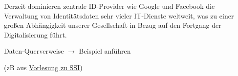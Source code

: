\vspace{0.3cm}


\begin{Problem}

Derzeit dominieren zentrale ID-Provider wie Google und Facebook die Verwaltung von Identitätsdaten sehr vieler IT-Dienste weltweit, was zu einer großen Abhängigkeit unserer Gesellschaft in Bezug auf den Fortgang der Digitalisierung führt.

\end{Problem}

\vspace{0.3cm}


\begin{Problem}

Daten-Querverweise $\rightarrow$ Beispiel anführen 

(zB aus \href{https://norbert-pohlmann.com/glossar-cyber-sicherheit/self-sovereign-identity-ssi/}{Vorlesung zu SSI})

\end{Problem}

\vspace{0.5cm}

